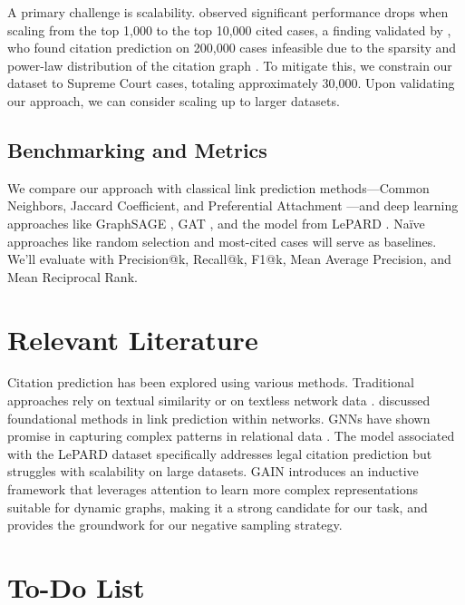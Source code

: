 \documentclass{article}
\begin{document}
A primary challenge is scalability. \citet{mahari2021autolaw} observed significant performance drops when scaling from the top 1,000 to the top 10,000 cited cases, a finding validated by \citet{mahari-etal-2024-lepard}, who found citation prediction on 200,000 cases infeasible due to the sparsity and power-law distribution of the citation graph \citep{post2000fractal}. To mitigate this, we constrain our dataset to Supreme Court cases, totaling approximately 30,000. Upon validating our approach, we can consider scaling up to larger datasets.

\subsection{Benchmarking and Metrics}

We compare our approach with classical link prediction methods—Common Neighbors, Jaccard Coefficient, and Preferential Attachment \citep{liben2007link}—and deep learning approaches like GraphSAGE \citep{hamilton2018inductive}, GAT \citep{velivckovic2018graph}, and the model from LePARD \citep{mahari-etal-2024-lepard}. Naïve approaches like random selection and most-cited cases will serve as baselines. We'll evaluate with Precision@k, Recall@k, F1@k, Mean Average Precision, and Mean Reciprocal Rank.

\section{Relevant Literature}

Citation prediction has been explored using various methods. Traditional approaches rely on textual similarity or on textless network data \citep{luo2023interpretability, knight2002network}. \citet{liben2007link} discussed foundational methods in link prediction within networks. GNNs have shown promise in capturing complex patterns in relational data \citep{hamilton2018inductive, velivckovic2018graph}. The model associated with the LePARD dataset \citep{mahari-etal-2024-lepard} specifically addresses legal citation prediction but struggles with scalability on large datasets. GAIN \citep{weng2022gain} introduces an inductive framework that leverages attention to learn more complex representations suitable for dynamic graphs, making it a strong candidate for our task, and \cite{Perozzi_2014} provides the groundwork for our negative sampling strategy. 

\section{To-Do List}
\end{document}
